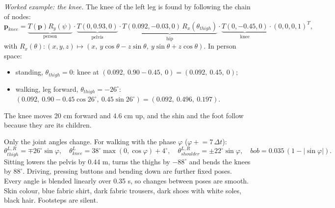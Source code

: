 \emph{Worked example: the knee.} The knee of the left leg is found by following the chain of nodes:
\[
\mathbf{p}_{knee} = \underbrace{T(\mathbf{p})R_y(\psi)}_{\text{person}}\cdot
\underbrace{T(0,0.93,0)}_{\text{pelvis}}\cdot
\underbrace{T(0.092,-0.03,0)\,R_x(\theta_{thigh})}_{\text{hip}}\cdot
\underbrace{T(0,-0.45,0)}_{\text{knee}}\cdot(0,0,0,1)^T,
\]
with $R_x(\theta):(x,y,z)\mapsto(x,\ y\cos\theta - z\sin\theta,\ y\sin\theta + z\cos\theta)$. In person space:
\begin{itemize}
  \item standing, $\theta_{thigh}=0$: knee at $(0.092,\ 0.90-0.45,\ 0) = (0.092,\ 0.45,\ 0)$;
  \item walking, leg forward, $\theta_{thigh}=-26^\circ$: $(0.092,\ 0.90-0.45\cos26^\circ,\ 0.45\sin26^\circ) = (0.092,\ 0.496,\ 0.197)$.
\end{itemize}
The knee moves 20 cm forward and 4.6 cm up, and the shin and the foot follow because they are its children.

 Only the joint angles change. For walking with the phase $\varphi$
($\varphi \mathrel{+}= 7\,\Delta t$):
\[
\theta_{thigh}^{L,R} = \mp 26^\circ\sin\varphi,\quad
\theta_{knee}^{L} = 38^\circ\max(0,\cos\varphi)+4^\circ,\quad
\theta_{shoulder}^{L,R} = \pm22^\circ\sin\varphi,\quad
bob = 0.035\,(1-|\sin\varphi|).
\]
Sitting lowers the pelvis by 0.44 m, turns the thighs by $-88^\circ$ and bends the knees by $88^\circ$. Driving,
pressing buttons and bending down are further fixed poses. Every angle is blended linearly over 0.35 s, so
changes between poses are smooth.
 Skin colour, blue fabric shirt, dark fabric trousers, dark shoes with
white soles, black hair. Footsteps are silent.

